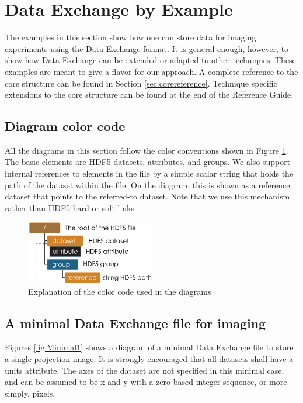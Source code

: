
\section{Data Exchange by Example}
The examples in this section show how one can store data for imaging experiments using the Data 
Exchange format. It is general enough, however, to show how Data Exchange can be extended or adapted 
to other techniques. These examples are meant to give a flavor for our approach. A complete reference to 
the core structure can be found in Section \ref{sec:corereference}. Technique specific extensions to the core 
structure can be found at the end of the Reference Guide.

\subsection{Diagram color code}
All the diagrams in this section follow the color conventions shown in Figure \ref{fig:DiagramColorCode}. 
The basic elements are HDF5 datasets, attributes, and groups. We also support internal references to 
elements in the file by a simple scalar string that holds the path of the dataset within the file. On the 
diagram, this is shown as a reference dataset that points to the referred-to dataset. Note that we use this 
mechanism rather than HDF5 hard or soft links
\label{DiagramColorCode}

\begin{figure}[h!]
\centering
\includegraphics[width=0.5\textwidth]{figures/dx_DiagramColorCode.pdf}
\caption{Explanation of the color code used in the diagrams}
\label{fig:DiagramColorCode}
\end{figure}

\subsection{A minimal Data Exchange file for imaging}
Figures \ref{fig:Minimal1} shows a diagram of a minimal Data Exchange file to store a single projection 
image.  It is strongly encouraged that all datasets shall have a units attribute. The axes of the dataset are 
not specified in this minimal
case, and can be assumed to be x and y with a zero-based integer sequence, or more simply, pixels.
 
